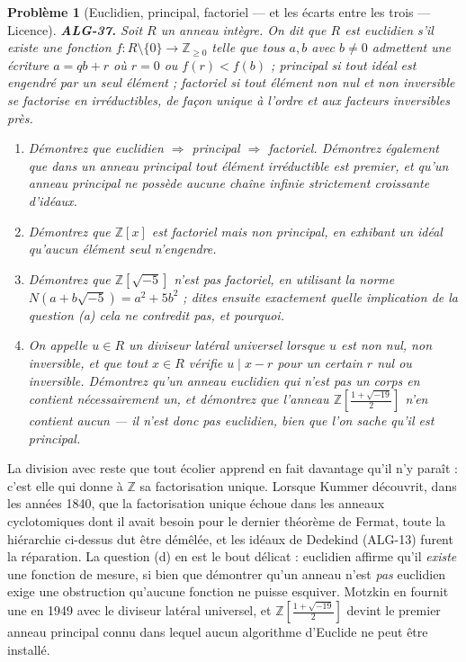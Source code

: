 \documentclass[11pt]{article}
\newtheorem{problem}{Problème}
\begin{document}
\bigskip

\begin{problem}[{Euclidien, principal, factoriel --- et les écarts entre les trois --- Licence}]
\textbf{ALG-37.} Soit $R$ un anneau intègre. On dit que $R$ est \textit{euclidien} s'il existe une
fonction $f : R \setminus \{0\} \to \mathbb{Z}_{\ge 0}$ telle que tous $a, b$ avec $b \ne 0$
admettent une écriture $a = qb + r$ où $r = 0$ ou $f(r) < f(b)$ ; \textit{principal} si tout idéal
est engendré par un seul élément ; \textit{factoriel} si tout élément non nul et non inversible se factorise
en irréductibles, de façon unique à l'ordre et aux facteurs inversibles près.
\begin{enumerate}
\item[(a)] Démontrez que euclidien $\Rightarrow$ principal $\Rightarrow$ factoriel. Démontrez également que
dans un anneau principal tout élément irréductible est premier, et qu'un anneau principal ne possède aucune
chaîne infinie strictement croissante d'idéaux.
\item[(b)] Démontrez que $\mathbb{Z}[x]$ est factoriel mais non principal, en exhibant un idéal qu'aucun
élément seul n'engendre.
\item[(c)] Démontrez que $\mathbb{Z}[\sqrt{-5}]$ n'est pas factoriel, en utilisant la norme
$N(a + b\sqrt{-5}) = a^2 + 5b^2$ ; dites ensuite exactement quelle implication de la question (a) cela ne
contredit \textit{pas}, et pourquoi.
\item[(d)] On appelle $u \in R$ un \textit{diviseur latéral universel} lorsque $u$ est non nul, non inversible,
et que tout $x \in R$ vérifie $u \mid x - r$ pour un certain $r$ nul ou inversible. Démontrez qu'un
anneau euclidien qui n'est pas un corps en contient nécessairement un, et démontrez que l'anneau
$\mathbb{Z}\!\left[\tfrac{1 + \sqrt{-19}}{2}\right]$ n'en contient aucun --- il n'est donc pas euclidien,
bien que l'on sache qu'il est principal.
\end{enumerate}

\end{problem}

\noindent La division avec reste que tout écolier apprend en fait davantage qu'il n'y paraît :
c'est elle qui donne à $\mathbb{Z}$ sa factorisation unique. Lorsque Kummer découvrit, dans les années
1840, que la factorisation unique échoue dans les anneaux cyclotomiques dont il avait besoin pour le dernier
théorème de Fermat, toute la hiérarchie ci-dessus dut être démêlée, et les idéaux de Dedekind (ALG-13) furent
la réparation. La question (d) en est le bout délicat : \og{} euclidien \fg{} affirme qu'il \textit{existe} une
fonction de mesure, si bien que démontrer qu'un anneau n'est \textit{pas} euclidien exige une obstruction
qu'aucune fonction ne puisse esquiver. Motzkin en fournit une en 1949 avec le diviseur latéral universel, et
$\mathbb{Z}\!\left[\tfrac{1+\sqrt{-19}}{2}\right]$ devint le premier anneau principal connu dans lequel
aucun algorithme d'Euclide ne peut être installé.
\end{document}
